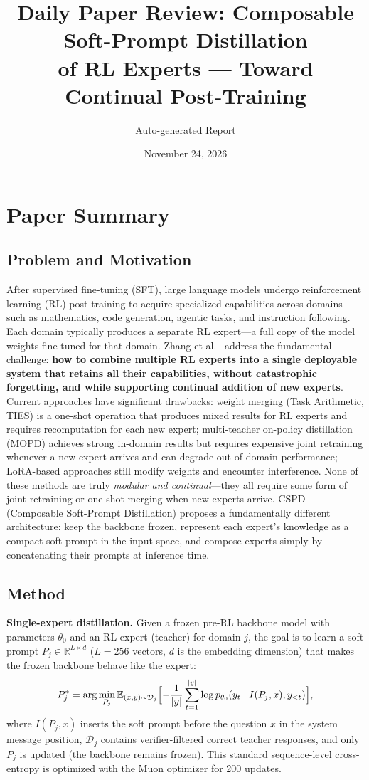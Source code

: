 \documentclass[11pt,a4paper]{article}
\title{Daily Paper Review: Composable Soft-Prompt Distillation\\of RL Experts --- Toward Continual Post-Training}
\author{Auto-generated Report}
\date{November 24, 2026}
\begin{document}
\maketitle

\section{Paper Summary}

\subsection{Problem and Motivation}
After supervised fine-tuning (SFT), large language models undergo reinforcement learning (RL) post-training to acquire specialized capabilities across domains such as mathematics, code generation, agentic tasks, and instruction following. Each domain typically produces a separate RL expert---a full copy of the model weights fine-tuned for that domain. Zhang et al.~\cite{zhang2026cspd} address the fundamental challenge: \textbf{how to combine multiple RL experts into a single deployable system that retains all their capabilities, without catastrophic forgetting, and while supporting continual addition of new experts}. Current approaches have significant drawbacks: weight merging (Task Arithmetic, TIES) is a one-shot operation that produces mixed results for RL experts and requires recomputation for each new expert; multi-teacher on-policy distillation (MOPD) achieves strong in-domain results but requires expensive joint retraining whenever a new expert arrives and can degrade out-of-domain performance; LoRA-based approaches still modify weights and encounter interference. None of these methods are truly \emph{modular and continual}---they all require some form of joint retraining or one-shot merging when new experts arrive. CSPD (Composable Soft-Prompt Distillation) proposes a fundamentally different architecture: keep the backbone frozen, represent each expert's knowledge as a compact soft prompt in the input space, and compose experts simply by concatenating their prompts at inference time.

\subsection{Method}
\textbf{Single-expert distillation.} Given a frozen pre-RL backbone model with parameters $\theta_0$ and an RL expert (teacher) for domain $j$, the goal is to learn a soft prompt $P_j \in \mathbb{R}^{L \times d}$ ($L{=}256$ vectors, $d$ is the embedding dimension) that makes the frozen backbone behave like the expert:
\[
  P_j^* = \arg\min_{P_j} \mathbb{E}_{(x,y) \sim \mathcal{D}_j} \Bigl[-\frac{1}{|y|}\sum_{t=1}^{|y|} \log p_{\theta_0}(y_t \mid I(P_j, x), y_{<t})\Bigr],
\]
where $I(P_j, x)$ inserts the soft prompt before the question $x$ in the system message position, $\mathcal{D}_j$ contains verifier-filtered correct teacher responses, and only $P_j$ is updated (the backbone remains frozen). This standard sequence-level cross-entropy is optimized with the Muon optimizer for 200 updates.
\end{document}
